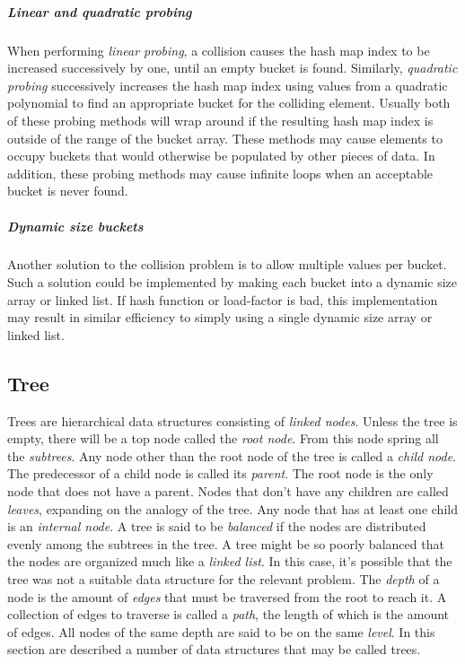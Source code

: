 \documentclass{article}
\begin{document}
\subparagraph{Linear and quadratic probing}
When performing {\em linear probing}, a collision causes the hash map index to be increased successively by one,
until an empty bucket is found. Similarly, {\em quadratic probing} successively increases the hash map index using
values from a quadratic polynomial to find an appropriate bucket for the colliding element. Usually both of these
probing methods will wrap around if the resulting hash map index is outside of the range of the bucket array.
These methods may cause elements to occupy buckets that would otherwise be populated by other pieces of data.
In addition, these probing methods may cause infinite loops when an acceptable bucket is never found.

\subparagraph{Dynamic size buckets}
Another solution to the collision problem is to allow multiple values per bucket. Such a solution could be
implemented by making each bucket into a dynamic size array or linked list. If hash function or load-factor is bad,
this implementation may result in similar efficiency to simply using a single dynamic size array or linked list.




\subsection{Tree}
Trees are hierarchical data structures consisting of {\em linked nodes}. Unless the tree is empty, there will be a
top node called the {\em root node}. From this node spring all the {\em subtrees}. Any node other than the root node
of the tree is called a {\em child node}. The predecessor of a child node is called its {\em parent}. The root node
is the only node that does not have a parent. Nodes that don't have any children are called {\em leaves}, expanding
on the analogy of the tree. Any node that has at least one child is an {\em internal node}. A tree is said to be
{\em balanced} if the nodes are distributed evenly among the subtrees in the tree. A tree might be so poorly
balanced that the nodes are organized much like a {\em linked list}. In this case, it's possible that the tree was
not a suitable data structure for the relevant problem. The {\em depth} of a node is the amount of {\em edges} that
must be traversed from the root to reach it. A collection of edges to traverse is called a {\em path}, the length of
which is the amount of edges. All nodes of the same depth are said to be on the same {\em level}.
In this section are described a number of data structures that may be called trees.
\end{document}
